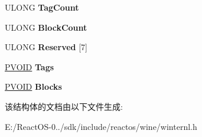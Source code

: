 \begin{DoxyCompactItemize}
U\+L\+O\+NG {\bfseries Tag\+Count}
\item 
\mbox{\label{struct___d_e_b_u_g___h_e_a_p___i_n_f_o_r_m_a_t_i_o_n_ae6009b0c675bc61b4ce75af5829d4b7f}} 
U\+L\+O\+NG {\bfseries Block\+Count}
\item 
\mbox{\label{struct___d_e_b_u_g___h_e_a_p___i_n_f_o_r_m_a_t_i_o_n_aa97fdec04fdeca6bc664123ef5c721d0}} 
U\+L\+O\+NG {\bfseries Reserved} \mbox{[}7\mbox{]}
\item 
\mbox{\label{struct___d_e_b_u_g___h_e_a_p___i_n_f_o_r_m_a_t_i_o_n_a94d5f335815e4bec4c21a801816e1391}} 
\hyperlink{interfacevoid}{P\+V\+O\+ID} {\bfseries Tags}
\item 
\mbox{\label{struct___d_e_b_u_g___h_e_a_p___i_n_f_o_r_m_a_t_i_o_n_a94769c85660dccea4554ef57a6d838a7}} 
\hyperlink{interfacevoid}{P\+V\+O\+ID} {\bfseries Blocks}
\end{DoxyCompactItemize}


该结构体的文档由以下文件生成\+:\begin{DoxyCompactItemize}
\item 
E\+:/\+React\+O\+S-\/0../sdk/include/reactos/wine/winternl.\+h\end{DoxyCompactItemize}
